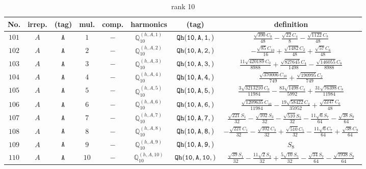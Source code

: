 \documentclass[fleqn,8pt]{jsarticle}
\begin{document}
\begin{table}[ht!]
\begin{center}
\caption{rank 10}
\renewcommand{\arraystretch}{1.3}
\begin{tabular}{cccccccc} \hline \hline
No. & irrep. & (tag) & mul. & comp. & harmonics & (tag) & definition \\ \hline
$ 101 $ & $ A $ & $ {\tt A} $ & $ 1 $ & $ - $ & $ \mathbb{Q}_{10}^{(h,A,1)} $ & $ {\tt Qh(10,A,1,)} $ & $ \frac{\sqrt{390} C_{0}}{48} - \frac{\sqrt{22} C_{4}}{8} - \frac{\sqrt{1122} C_{8}}{48} $ \\
$ 102 $ & $ A $ & $ {\tt A} $ & $ 2 $ & $ - $ & $ \mathbb{Q}_{10}^{(h,A,2)} $ & $ {\tt Qh(10,A,2,)} $ & $ - \frac{\sqrt{85} C_{10}}{16} + \frac{\sqrt{1482} C_{2}}{48} + \frac{\sqrt{57} C_{6}}{48} $ \\
$ 103 $ & $ A $ & $ {\tt A} $ & $ 3 $ & $ - $ & $ \mathbb{Q}_{10}^{(h,A,3)} $ & $ {\tt Qh(10,A,3,)} $ & $ \frac{11 \sqrt{420189} C_{0}}{8988} + \frac{\sqrt{827645} C_{4}}{1498} - \frac{\sqrt{146055} C_{8}}{8988} $ \\
$ 104 $ & $ A $ & $ {\tt A} $ & $ 4 $ & $ - $ & $ \mathbb{Q}_{10}^{(h,A,4)} $ & $ {\tt Qh(10,A,4,)} $ & $ \frac{\sqrt{370006} C_{10}}{749} + \frac{\sqrt{190995} C_{2}}{749} $ \\
$ 105 $ & $ A $ & $ {\tt A} $ & $ 5 $ & $ - $ & $ \mathbb{Q}_{10}^{(h,A,5)} $ & $ {\tt Qh(10,A,5,)} $ & $ \frac{3 \sqrt{3213210} C_{0}}{11984} - \frac{83 \sqrt{1498} C_{4}}{5992} + \frac{31 \sqrt{76398} C_{8}}{11984} $ \\
$ 106 $ & $ A $ & $ {\tt A} $ & $ 6 $ & $ - $ & $ \mathbb{Q}_{10}^{(h,A,6)} $ & $ {\tt Qh(10,A,6,)} $ & $ \frac{\sqrt{1209635} C_{10}}{11984} - \frac{19 \sqrt{58422} C_{2}}{35952} + \frac{\sqrt{2247} C_{6}}{48} $ \\
$ 107 $ & $ A $ & $ {\tt A} $ & $ 7 $ & $ - $ & $ \mathbb{Q}_{10}^{(h,A,7)} $ & $ {\tt Qh(10,A,7,)} $ & $ \frac{\sqrt{221} S_{1}}{32} - \frac{\sqrt{102} S_{3}}{32} - \frac{\sqrt{510} S_{5}}{32} - \frac{11 \sqrt{6} S_{7}}{64} - \frac{\sqrt{38} S_{9}}{64} $ \\
$ 108 $ & $ A $ & $ {\tt A} $ & $ 8 $ & $ - $ & $ \mathbb{Q}_{10}^{(h,A,8)} $ & $ {\tt Qh(10,A,8,)} $ & $ - \frac{\sqrt{221} C_{1}}{32} - \frac{\sqrt{102} C_{3}}{32} + \frac{\sqrt{510} C_{5}}{32} - \frac{11 \sqrt{6} C_{7}}{64} + \frac{\sqrt{38} C_{9}}{64} $ \\
$ 109 $ & $ A $ & $ {\tt A} $ & $ 9 $ & $ - $ & $ \mathbb{Q}_{10}^{(h,A,9)} $ & $ {\tt Qh(10,A,9,)} $ & $ S_{8} $ \\
$ 110 $ & $ A $ & $ {\tt A} $ & $ 10 $ & $ - $ & $ \mathbb{Q}_{10}^{(h,A,10)} $ & $ {\tt Qh(10,A,10,)} $ & $ \frac{\sqrt{39} S_{1}}{32} - \frac{11 \sqrt{2} S_{3}}{32} + \frac{5 \sqrt{10} S_{5}}{32} - \frac{\sqrt{34} S_{7}}{64} - \frac{\sqrt{1938} S_{9}}{64} $ \\

\end{tabular}
\end{center}
\end{table}
\end{document}
